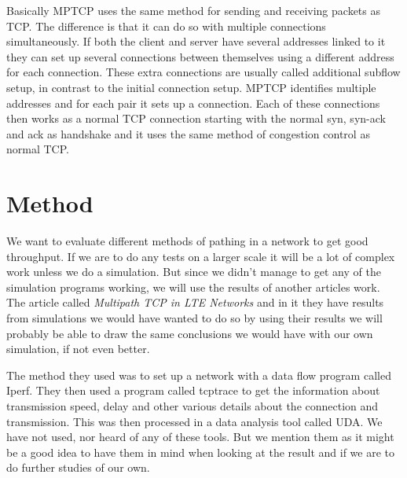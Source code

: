\documentclass[11pt,twocolumn]{article}
\begin{document}
Basically MPTCP uses the same method for sending and receiving packets as TCP. The difference is that it can do so with multiple connections simultaneously. If both the client and server have several addresses linked to it they can set up several connections between themselves using a different address for each connection. These extra connections are usually called additional subflow setup, in contrast to the initial connection setup. MPTCP identifies multiple addresses and for each pair it sets up a connection. Each of these connections then works as a normal TCP connection starting with the normal syn, syn-ack and ack as handshake and it uses the same method of congestion control as normal TCP. 

\section{Method}

We want to evaluate different methods of pathing in a network to get good throughput. If we are to do any tests on a larger scale it will be a lot of complex work unless we do a simulation. But since we didn't manage to get any of the simulation programs working, we will use the results of another articles work. The article called \emph{Multipath TCP in LTE Networks} and in it they have results from simulations we would have wanted to do so by using their results we will probably be able to draw the same conclusions we would have with our own simulation, if not even better.

The method they used was to set up a network with a data flow program called Iperf. They then used a program called tcptrace to get the information about transmission speed, delay and other various details about the connection and transmission. This was then processed in a data analysis tool called UDA. We have not used, nor heard of any of these tools. But we mention them as it might be a good idea to have them in mind when looking at the result and if we are to do further studies of our own.


\end{document}
